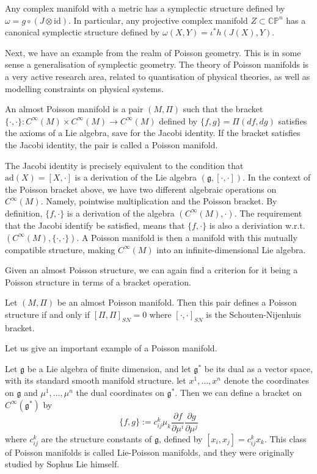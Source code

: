 \begin{corollary}
  Any complex manifold with a metric has a symplectic structure defined by $\omega=g\circ (J\otimes\text{id})$. In particular, any projective complex manifold $Z\subset\mathbb{CP}^n$ has a canonical symplectic structure defined by $\omega(X,Y)=\iota^*h(J(X),Y)$.
\end{corollary}
Next, we have an example from the realm of Poisson geometry. This is in some sense a generalisation of symplectic geometry. The theory of Poisson manifolds is a very active research area, related to quantisation of physical theories, as well as modelling constraints on physical systems.
\begin{definition}
  An almost Poisson manifold is a pair $(M,\Pi)$ such that the bracket $\{\cdot,\cdot\}:C^\infty(M)\times C^\infty(M)\to C^\infty(M)$ defined by $\{f,g\}=\Pi(df,dg)$ satisfies the axioms of a Lie algebra, save for the Jacobi identity. If the bracket satisfies the Jacobi identity, the pair is called a Poisson manifold.
\end{definition}
\begin{remark}
  The Jacobi identity is precisely equivalent to the condition that $\text{ad}(X)=[X,\cdot]$ is a derivation of the Lie algebra $(\mathfrak{g},[\cdot,\cdot])$. In the context of the Poisson bracket above, we have two different algebraic operations on $C^\infty(M)$. Namely, pointwise multiplication and the Poisson bracket. By definition, $\{f,\cdot\}$ is a derivation of the algebra $(C^\infty(M),\cdot)$. The requirement that the Jacobi identify be satisfied, means that $\{f,\cdot\}$ is also a deriviation w.r.t. $(C^\infty(M),\{\cdot,\cdot\})$. A Poisson manifold is then a manifold with this mutually compatible structure, making $C^\infty(M)$ into an infinite-dimensional Lie algebra.
\end{remark}
Given an almost Poisson structure, we can again find a criterion for it being a Poisson structure in terms of a bracket operation.
\begin{theorem}
  Let $(M,\Pi)$ be an almost Poisson manifold. Then this pair defines a Poisson structure if and only if $[\Pi,\Pi]_{SN}=0$ where $[\cdot,\cdot]_{SN}$ is the Schouten-Nijenhuis bracket.
\end{theorem}
Let us give an important example of a Poisson manifold.
\begin{example}
  Let $\mathfrak{g}$ be a Lie algebra of finite dimension, and let $\mathfrak{g}^*$ be its dual as a vector space, with its standard smooth manifold structure. let $x^1,\dots,x^n$ denote the coordinates on $\mathfrak{g}$ and $\mu^1,\dots,\mu^n$ the dual coordinates on $\mathfrak{g}^*$. Then we can define a bracket on $C^\infty(\mathfrak{g}^*)$ by 
  $$\{f,g\}:= c_{ij}^k\mu_k\frac{\partial f}{\partial\mu^i}\frac{\partial g}{\partial\mu^j}$$
  where $c_{ij}^k$ are the structure constants of $\mathfrak{g}$, defined by $[x_i,x_j]=c_{ij}^kx_k$. This class of Poisson manifolds is called Lie-Poisson manifolds, and they were originally studied by Sophus Lie himself.
\end{example}
